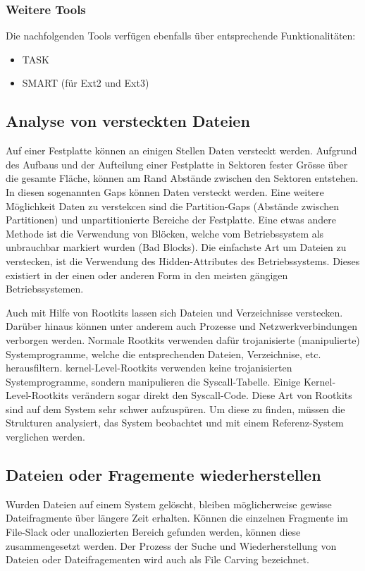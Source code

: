 \subsubsection{Weitere Tools}
Die nachfolgenden Tools verfügen ebenfalls über entsprechende Funktionalitäten:
\begin{itemize}
\item TASK
\item SMART (für Ext2 und Ext3)
\end{itemize}


\subsection{Analyse von versteckten Dateien}
Auf einer Festplatte können an einigen Stellen Daten versteckt werden. Aufgrund des Aufbaus und der Aufteilung einer Festplatte in Sektoren fester Grösse über die gesamte Fläche, können am Rand Abstände zwischen den Sektoren entstehen. In diesen sogenannten Gaps können Daten versteckt werden. Eine weitere Möglichkeit Daten zu verstekcen sind die Partition-Gaps (Abstände zwischen Partitionen) und unpartitionierte Bereiche der Festplatte. Eine etwas andere Methode ist die Verwendung von Blöcken, welche vom Betriebssystem als unbrauchbar markiert wurden (Bad Blocks).  Die einfachste Art um Dateien zu verstecken, ist die Verwendung des Hidden-Attributes des Betriebssystems. Dieses existiert in der einen oder anderen Form in den meisten gängigen Betriebssystemen.

Auch mit Hilfe von Rootkits lassen sich Dateien und Verzeichnisse verstecken. Darüber hinaus können unter anderem auch Prozesse und Netzwerkverbindungen verborgen werden. Normale Rootkits verwenden dafür trojanisierte (manipulierte) Systemprogramme, welche die entsprechenden Dateien, Verzeichnise, etc. herausfiltern. kernel-Level-Rootkits verwenden keine trojanisierten Systemprogramme, sondern manipulieren die Syscall-Tabelle. Einige Kernel-Level-Rootkits verändern sogar direkt den Syscall-Code. Diese Art von Rootkits sind auf dem System sehr schwer aufzuspüren. Um diese zu finden, müssen die Strukturen analysiert, das System beobachtet und mit einem Referenz-System verglichen werden.



\subsection{Dateien oder Fragemente wiederherstellen}
Wurden Dateien auf einem System gelöscht, bleiben möglicherweise gewisse Dateifragmente über längere Zeit erhalten. Können die einzelnen Fragmente im File-Slack oder unallozierten Bereich gefunden werden, können diese zusammengesetzt werden. Der Prozess der Suche und Wiederherstellung von Dateien oder Dateifragementen wird auch als File Carving bezeichnet.

